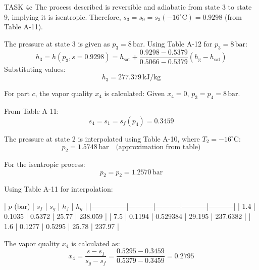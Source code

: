 TASK 4c  
The process described is reversible and adiabatic from state 3 to state 9, implying it is isentropic. Therefore, \( s_3 = s_9 = s_3(-16^\circ\text{C}) = 0.9298 \) (from Table A-11).  

The pressure at state 3 is given as \( p_3 = 8 \, \text{bar} \). Using Table A-12 for \( p_3 = 8 \, \text{bar} \):  
\[
h_3 = h(p_3, s = 0.9298) = h_{\text{sat}} + \frac{0.9298 - 0.5379}{0.5066 - 0.5379} (h_{\text{g}} - h_{\text{sat}})
\]
Substituting values:  
\[
h_3 = 277.379 \, \text{kJ/kg}
\]

For part \( c \), the vapor quality \( x_4 \) is calculated:  
Given \( x_4 = 0 \), \( p_3 = p_4 = 8 \, \text{bar} \).  

From Table A-11:  
\[
s_4 = s_1 = s_f(p_4) = 0.3459
\]

The pressure at state 2 is interpolated using Table A-10, where \( T_2 = -16^\circ\text{C} \):  
\[
p_2 = 1.5748 \, \text{bar} \quad \text{(approximation from table)}
\]

For the isentropic process:  
\[
p_2 = p_2 = 1.2570 \, \text{bar}
\]

Using Table A-11 for interpolation:  

| \( p \) (bar) | \( s_f \) | \( s_g \) | \( h_f \) | \( h_g \) |  
|---------------|-----------|-----------|-----------|-----------|  
| 1.4           | 0.1035    | 0.5372    | 25.77     | 238.059   |  
| 7.5           | 0.1194    | 0.529384  | 29.195    | 237.6382  |  
| 1.6           | 0.1277    | 0.5295    | 25.78     | 237.97    |  

The vapor quality \( x_4 \) is calculated as:  
\[
x_4 = \frac{s - s_f}{s_g - s_f} = \frac{0.5295 - 0.3459}{0.5379 - 0.3459} = 0.2795
\]